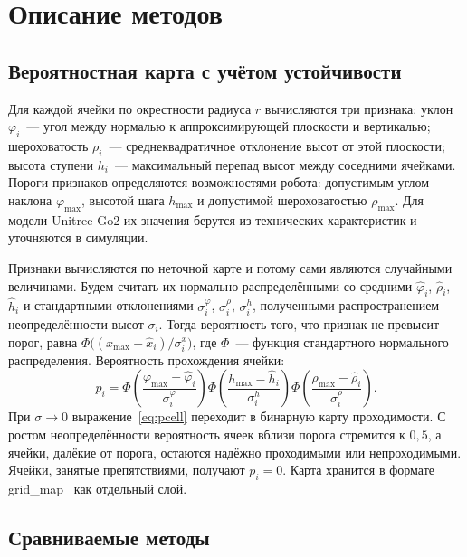 \documentclass{misisarticle}
\begin{document}
\section{Описание методов}

\subsection{Вероятностная карта с учётом устойчивости}

Для каждой ячейки по окрестности радиуса $r$ вычисляются три признака: уклон $\varphi_i$~--- угол между нормалью к аппроксимирующей плоскости и вертикалью; шероховатость $\rho_i$~--- среднеквадратичное отклонение высот от этой плоскости; высота ступени $h_i$~--- максимальный перепад высот между соседними ячейками. Пороги признаков определяются возможностями робота: допустимым углом наклона $\varphi_{\max}$, высотой шага $h_{\max}$ и допустимой шероховатостью $\rho_{\max}$. Для модели Unitree Go2 их значения берутся из технических характеристик и уточняются в симуляции.

Признаки вычисляются по неточной карте и потому сами являются случайными величинами. Будем считать их нормально распределёнными со средними $\hat\varphi_i$, $\hat\rho_i$, $\hat h_i$ и стандартными отклонениями $\sigma^{\varphi}_i$, $\sigma^{\rho}_i$, $\sigma^{h}_i$, полученными распространением неопределённости высот $\sigma_i$. Тогда вероятность того, что признак не превысит порог, равна $\Phi\big((x_{\max} - \hat x_i)/\sigma^{x}_i\big)$, где $\Phi$~--- функция стандартного нормального распределения. Вероятность прохождения ячейки:
\begin{equation}
  p_i = \Phi\!\left(\frac{\varphi_{\max} - \hat\varphi_i}{\sigma^{\varphi}_i}\right)
        \Phi\!\left(\frac{h_{\max} - \hat h_i}{\sigma^{h}_i}\right)
        \Phi\!\left(\frac{\rho_{\max} - \hat\rho_i}{\sigma^{\rho}_i}\right).
  \label{eq:pcell}
\end{equation}
При $\sigma \to 0$ выражение~\eqref{eq:pcell} переходит в бинарную карту проходимости. С ростом неопределённости вероятность ячеек вблизи порога стремится к $0{,}5$, а ячейки, далёкие от порога, остаются надёжно проходимыми или непроходимыми. Ячейки, занятые препятствиями, получают $p_i = 0$. Карта хранится в формате grid\_map~\cite{fankhauser2016} как отдельный слой.

\subsection{Сравниваемые методы}
\end{document}
